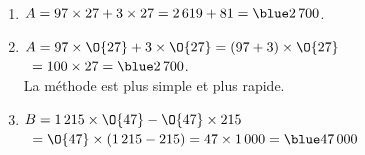    \ \\ [-5mm]
   \begin{enumerate}
      \item $A=97\times27+3\times27 =2\,619+81 =\blue2\,700$.
      \item $A=97\times\O{27}+3\times\O{27} =(97+3)\times\O{27}$ \\
         \quad\, $=100\times27 =\blue2\,700$. \\
         {\blue La méthode  est plus simple et plus rapide}.
      \item $B =1\,215\times\O{47}-\O{47}\times215$ \\
         \quad\, $=\O{47}\times(1\,215-215) =47\times1\,000 =\blue 47\,000$
   \end{enumerate}
